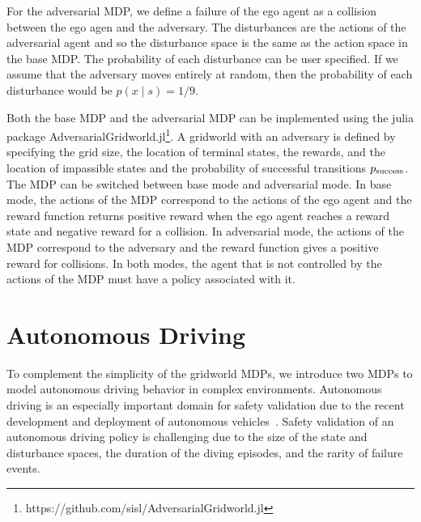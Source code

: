 For the adversarial MDP, we define a failure of the ego agent as a collision between the ego agen and the adversary. The disturbances are the actions of the adversarial agent and so the disturbance space is the same as the action space in the base MDP. The probability of each disturbance can be user specified. If we assume that the adversary moves entirely at random, then the probability of each disturbance would be $p(x \mid s) = 1 / 9$.

Both the base MDP and the adversarial MDP can be implemented using the julia package AdversarialGridworld.jl\footnote{https://github.com/sisl/AdversarialGridworld.jl}. A gridworld with an adversary is defined by specifying the grid size, the location of terminal states, the rewards, and the location of impassible states and the probability of successful transitions $p_{\rm success}$. The MDP can be switched between base mode and adversarial mode. In base mode, the actions of the MDP correspond to the actions of the ego agent and the reward function returns positive reward when the ego agent reaches a reward state and negative reward for a collision. In adversarial mode, the actions of the MDP correspond to the adversary and the reward function gives a positive reward for collisions. In both modes, the agent that is not controlled by the actions of the MDP must have a policy associated with it.

\section{Autonomous Driving}
To complement the simplicity of the gridworld MDPs, we introduce two MDPs to model autonomous driving behavior in complex environments. Autonomous driving is an especially important domain for safety validation due to the recent development and deployment of autonomous vehicles~\cite{koopman2016challenges}. Safety validation of an autonomous driving policy is challenging due to the size of the state and disturbance spaces, the duration of the diving episodes, and the rarity of failure events.

